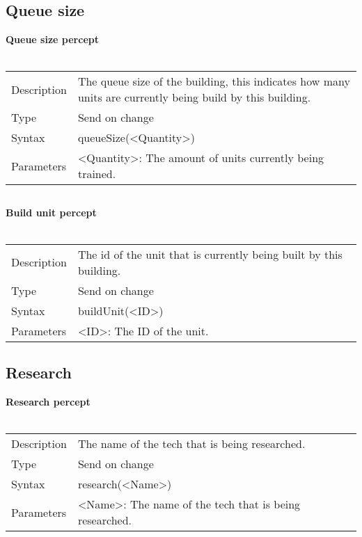 \documentclass[english,11pt]{report}
\begin{document}
\newpage
\subsection{Queue size}
\textbf{Queue size percept}\\
\\
\begin{tabularx}{\textwidth}{lX}
 Description & The queue size of the building, this indicates how many units are currently being build by this building. \\
 Type & Send on change \\
 Syntax & queueSize(<Quantity>) \\
 Parameters &   <Quantity>: The amount of units currently being trained.
\end{tabularx}

\subsection{}
\textbf{Build unit percept}\\
\\
\begin{tabularx}{\textwidth}{lX}
 Description & The id of the unit that is currently being built by this building. \\
 Type & Send on change \\
 Syntax & buildUnit(<ID>) \\
 Parameters &   <ID>: The ID of the unit.
\end{tabularx}

\subsection{Research}
\textbf{Research percept}\\
\\
\begin{tabularx}{\textwidth}{lX}
 Description & The name of the tech that is being researched. \\
 Type & Send on change \\
 Syntax & research(<Name>) \\
 Parameters &   <Name>: The name of the tech that is being researched.
\end{tabularx}
\end{document}
